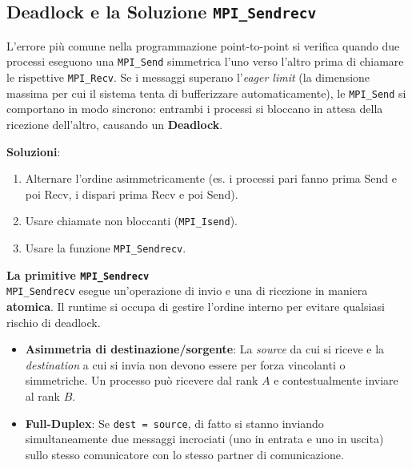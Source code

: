 \subsection{Deadlock e la Soluzione \texttt{MPI\_Sendrecv}}
L'errore più comune nella programmazione point-to-point si verifica quando due processi eseguono una \texttt{MPI\_Send} simmetrica l'uno verso l'altro prima di chiamare le rispettive \texttt{MPI\_Recv}. 
Se i messaggi superano l'\textit{eager limit} (la dimensione massima per cui il sistema tenta di bufferizzare automaticamente), le \texttt{MPI\_Send} si comportano in modo sincrono: entrambi i processi si bloccano in attesa della ricezione dell'altro, causando un \textbf{Deadlock}.

\vspace{0.3cm}
\noindent
\textbf{Soluzioni}:
\begin{enumerate}
    \item Alternare l'ordine asimmetricamente (es. i processi pari fanno prima Send e poi Recv, i dispari prima Recv e poi Send).
    \item Usare chiamate non bloccanti (\texttt{MPI\_Isend}).
    \item Usare la funzione \texttt{MPI\_Sendrecv}.
\end{enumerate}

\begin{framed}
\noindent
\textbf{La primitive \texttt{MPI\_Sendrecv}} \\
\texttt{MPI\_Sendrecv} esegue un'operazione di invio e una di ricezione in maniera \textbf{atomica}. Il runtime si occupa di gestire l'ordine interno per evitare qualsiasi rischio di deadlock.
\begin{itemize}
    \item \textbf{Asimmetria di destinazione/sorgente}: La \textit{source} da cui si riceve e la \textit{destination} a cui si invia non devono essere per forza vincolanti o simmetriche. Un processo può ricevere dal rank $A$ e contestualmente inviare al rank $B$.
    \item \textbf{Full-Duplex}: Se \texttt{dest = source}, di fatto si stanno inviando simultaneamente due messaggi incrociati (uno in entrata e uno in uscita) sullo stesso comunicatore con lo stesso partner di comunicazione.
\end{itemize}
\end{framed}

